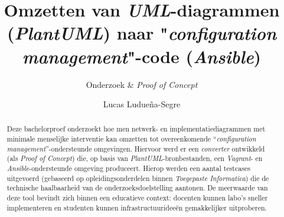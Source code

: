 \documentclass[a0,portrait]{hogent-poster}
\title{Omzetten van \emph{UML}-diagrammen (\emph{PlantUML}) naar "\emph{configuration management}"-code (\emph{Ansible})}
\subtitle{Onderzoek \& \emph{Proof of Concept}}
\author{Lucas Ludueña-Segre}
\begin{document}
\maketitle

\begin{abstract}
      Deze bachelorproef onderzoekt hoe men netwerk- en implementatiediagrammen met minimale menselijke interventie kan omzetten tot overeenkomende ``\emph{configuration management}''-ondersteunde omgevingen.
      Hiervoor werd er een \emph{converter} ontwikkeld (als \emph{Proof of Concept}) die, op basis van \emph{PlantUML}-bron\-bes\-tan\-den, een \emph{Vagrant}- en \emph{Ansible}-ondersteunde omgeving produceert.
      Hierop werden een aantal testcases uitgevoerd (gebaseerd op opleidingsonderdelen binnen \emph{Toegepaste Informatica}) die de technische haalbaarheid van de onderzoeksdoelstelling aantonen.
      De meerwaarde van deze tool bevindt zich binnen een educatieve context: docenten kunnen labo's sneller implementeren en studenten kunnen infrastructuurideeën gemakkelijker uitproberen.
\end{abstract}
\end{document}
